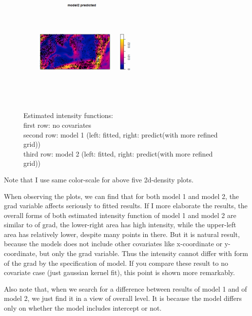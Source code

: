 \documentclass{article}
\begin{document}
\begin{figure}[h]
    \includegraphics[width=6cm]{prob3_model2_predict.png}
    \caption{Estimated intensity functions: \\
    first row: no covariates\\
    second row: model 1 (left: fitted, right: predict(with more refined grid)) \\
    third row: model 2 (left: fitted, right: predict(with more refined grid))
    }
\end{figure}

\clearpage
Note that I use same color-scale for above five 2d-density plots.

When observing the plots, we can find that for both model 1 and model 2,
the grad variable affects seriously to fitted results. 
If I more elaborate the results, the overall forms of both estimated intensity function of model 1 and model 2 are similar to of grad, the lower-right area has high intensity,
while the upper-left area has relatively lower, despite many points in there.
But it is natural result, because the models does not include other covariates like x-coordinate or y-coordinate,
but only the grad variable. Thus the intensity cannot differ with form of the grad by the specification of model.
If you compare these result to no covariate case (just gaussian kernel fit), this point is shown more remarkably.

Also note that, when we search for a difference between results of model 1 and of model 2,
we just find it in a view of overall level. It is because the model differs only on whether the model includes intercept or not.
\end{document}
